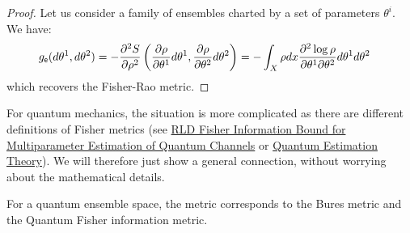 \begin{proof}
	Let us consider a family of ensembles charted by a set of parameters $\theta^i$. We have:
	\begin{equation}
		\begin{aligned}
			g_{\mathsf{e}}(d\theta^1, d\theta^2) &= - \frac{\partial^2 S}{\partial \rho^2}\left(\frac{\partial 
				\rho}{\partial \theta^1} d\theta^1, \frac{\partial 
				\rho}{\partial \theta^2} d\theta^2\right) = - \int_X \rho dx \frac{\partial^2 \log \rho}{\partial \theta^1 \partial \theta^2}d\theta^1 d\theta^2
		\end{aligned}
	\end{equation}
	which recovers the Fisher-Rao metric.
	
\end{proof}

\begin{remark}
	For quantum mechanics, the situation is more complicated as there are different definitions of Fisher metrics (see \href{https://arxiv.org/pdf/2008.11178}{RLD Fisher Information Bound for Multiparameter
	Estimation of Quantum Channels} or \href{https://link.springer.com/chapter/10.1007/978-4-431-54493-7_4}{Quantum Estimation Theory}). We will therefore just show a general connection, without worrying about the mathematical details.
	
\end{remark}

\begin{prop}
	For a quantum ensemble space, the metric corresponds to the Bures metric and the Quantum Fisher information metric.
\end{prop}

